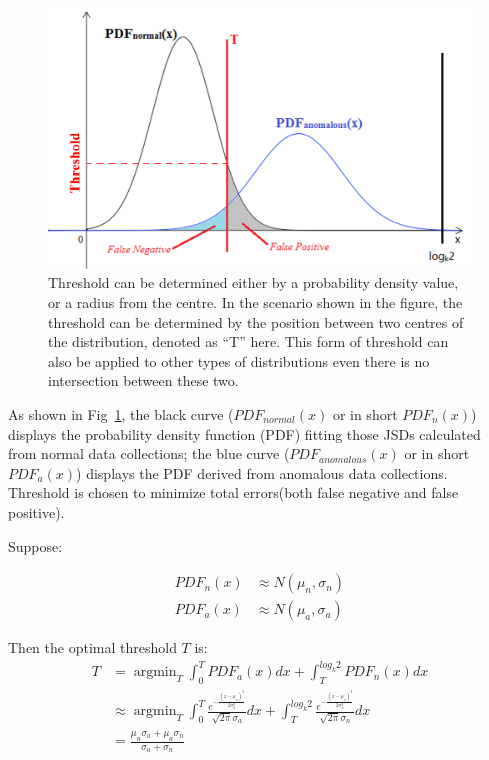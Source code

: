 \documentclass[10pt,conference,letterpaper]{IEEEtran}
\begin{document}
			\begin{figure}[!t]
				\centering
				\includegraphics[width=\linewidth]{fig/ExampleThreshold.png}
				\caption{Threshold can be determined either by a probability density value, or a radius from the centre. In the scenario shown in the figure, the threshold can be determined by the position between two centres of the distribution, denoted as ``T'' here. This form of threshold can also be applied to other types of distributions even there is no intersection between these two.}
				\label{fig:example-threshold}
			\end{figure}
	
			As shown in Fig~\ref{fig:example-threshold}, the black curve ($PDF_{normal}(x)$ or in short $PDF_n(x)$) displays the probability density function (PDF) fitting those JSDs calculated from normal data collections; the blue curve ($PDF_{anomalous}(x)$ or in short $PDF_a(x)$) displays the PDF derived from anomalous data collections. Threshold is chosen to minimize total errors(both false negative and false positive).
			
			Suppose:
	
			\begin{align}
				PDF_{n}(x) &\approx N(\mu_n, \sigma_n)\\
				PDF_{a}(x) &\approx N(\mu_a, \sigma_a)
			\end{align}
			
			Then the optimal threshold $T$ is:
			\begin{equation}\label{equ:linear-weight}
				\begin{split}
					T &= \mathop{\arg\min}_{T} \int_{0}^{T}PDF_{a}(x)dx +
					\int_{T}^{log_k2}PDF_{n}(x)dx\\
					& \approx \mathop{\arg\min}_{T}
					\int_{0}^{T}
					\frac{e^{-\frac{(x - \mu_a)^2}{2\sigma_a^2}}}{\sqrt{2\pi} \sigma_a}dx
					+ \int_{T}^{log_k2}
					\frac{e^{-\frac{(x - \mu_n)^2}{2\sigma_n^2}}}{\sqrt{2\pi} \sigma_n}dx\\
					& = \frac{\mu_n\sigma_a + \mu_a\sigma_n}{\sigma_a + \sigma_n}
				\end{split}
			\end{equation}
	
\end{document}
